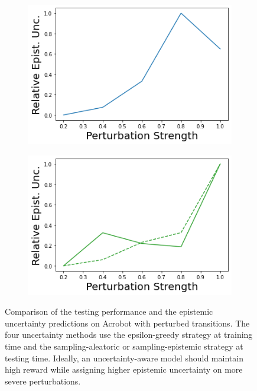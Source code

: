 \begin{figure}
\begin{subfigure}{.245\textwidth}
        \includegraphics[width=\textwidth]{sections/011_icml2022/resources/transition_shift-DKL-AcrobotShift-v0-mean_epistemic_uncertainty_.png}
    \end{subfigure}
    \begin{subfigure}{.245\textwidth}
        \includegraphics[width=\textwidth]{sections/011_icml2022/resources/transition_shift-PostNet-AcrobotShift-v0-mean_epistemic_uncertainty_.png}
    \end{subfigure}
        \vspace{-2mm}
    \caption{Comparison of the testing performance and the epistemic uncertainty predictions on Acrobot with perturbed transitions. The four uncertainty methods use the epsilon-greedy strategy at training time and the sampling-aleatoric or sampling-epistemic strategy at testing time. Ideally, an uncertainty-aware model should maintain high reward while assigning higher epistemic uncertainty on more severe perturbations.}
    \label{fig:strategy-transition-shift-testing-performance-acrobot}
        \vspace{-3mm}
\end{figure}